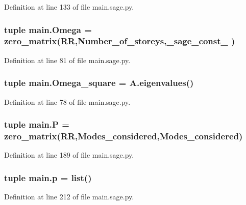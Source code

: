 Definition at line 133 of file main.\+sage.\+py.

\hypertarget{namespacemain_af44dcb60e61649c65257466d65b4d548}{}
\subsubsection[{Omega}]{\setlength{\rightskip}{0pt plus 5cm}tuple main.\+Omega = zero\+\_\+matrix(R\+R,Number\+\_\+of\+\_\+storeys,\+\_\+sage\+\_\+const\+\_ )}\label{namespacemain_af44dcb60e61649c65257466d65b4d548}


Definition at line 81 of file main.\+sage.\+py.

\hypertarget{namespacemain_a63066086ca439ff34de16475b00387f5}{}
\subsubsection[{Omega\+\_\+square}]{\setlength{\rightskip}{0pt plus 5cm}tuple main.\+Omega\+\_\+square = A.\+eigenvalues()}\label{namespacemain_a63066086ca439ff34de16475b00387f5}


Definition at line 78 of file main.\+sage.\+py.

\hypertarget{namespacemain_ad403610ba53df02f8dfaff8dd64227b3}{}
\subsubsection[{P}]{\setlength{\rightskip}{0pt plus 5cm}tuple main.\+P = zero\+\_\+matrix(R\+R,{\bf Modes\+\_\+considered},{\bf Modes\+\_\+considered})}\label{namespacemain_ad403610ba53df02f8dfaff8dd64227b3}


Definition at line 189 of file main.\+sage.\+py.

\hypertarget{namespacemain_ab31fc16b432d2248a6c76c6a18d741d0}{}
\subsubsection[{p}]{\setlength{\rightskip}{0pt plus 5cm}tuple main.\+p = list()}\label{namespacemain_ab31fc16b432d2248a6c76c6a18d741d0}


Definition at line 212 of file main.\+sage.\+py.

\hypertarget{namespacemain_add7e0394c94a2e2115aff785eb6995e3}{}
